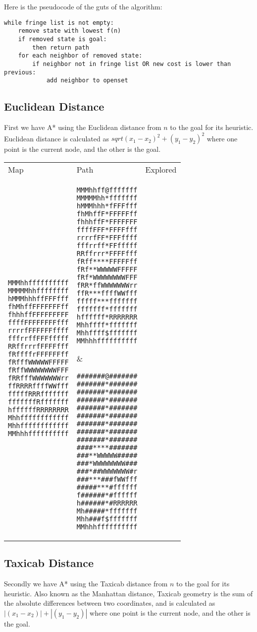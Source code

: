\documentclass[12pt, article]{scrartcl}
\begin{document}
Here is the pseudocode of the guts of the algorithm:
\begin{verbatim}
while fringe list is not empty:
    remove state with lowest f(n)
    if removed state is goal:
        then return path
    for each neighbor of removed state:
        if neighbor not in fringe list OR new cost is lower than previous:
            add neighbor to openset
\end{verbatim}

\subsection{Euclidean Distance}
First we have A* using the Euclidean distance from $n$ to the goal for its heuristic. Euclidean distance is calculated as $sqrt{(x_1-x_2)^2 + (y_1-y_2)^2}$ where one point is the current node, and the other is the goal.\\

\begin{tabular}{p{2in} p{2in} p{2in}}
Map & Path & Explored \\

\begin{verbatim}
MMMhhffffffffff
MMMMMhhffffffff
hMMMhhhffFFFfff
fhMhffFFFFFFFff
fhhhffFFFFFFFFF
ffffFFFFFFFFfff
rrrrfFFFFFFffff
fffrrffFFFfffff
RRffrrrfFFFFfff
fRffffrFFFFFFff
fRfffWWWWWFFFFF
fRffWWWWWWWWFFF
fRRfffWWWWWWWrr
ffRRRRffffWWfff
fffffRRRfffffff
fffffffRfffffff
hffffffRRRRRRRR
Mhhffffffffffff
Mhhffffffffffff
MMhhhffffffffff
\end{verbatim}
&
\begin{verbatim}
MMMhhff@fffffff
MMMMMhh*fffffff
hMMMhhh*fFFFfff
fhMhffF*FFFFFff
fhhhffF*FFFFFFF
ffffFFF*FFFFfff
rrrrfFF*FFFffff
fffrrff*FFfffff
RRffrrr*FFFFfff
fRff****FFFFFff
fRf**WWWWWFFFFF
fRf*WWWWWWWWFFF
fRR*ffWWWWWWWrr
ffR***ffffWWfff
fffff***fffffff
fffffff*fffffff
hffffff*RRRRRRR
Mhhffff*fffffff
Mhhffff$fffffff
MMhhhffffffffff
\end{verbatim}
&
\begin{verbatim}
#######@#######
#######*#######
#######*#######
#######*#######
#######*#######
#######*#######
#######*#######
#######*#######
#######*#######
####****#######
###**WWWWW#####
###*WWWWWWWW###
###*##WWWWWWW#r
###***###fWWfff
#####***#ffffff
f######*#ffffff
h######*#RRRRRR
Mh#####*fffffff
Mhh###f$fffffff
MMhhhffffffffff
\end{verbatim}
\end{tabular}

\subsection{Taxicab Distance}
Secondly we have A* using the Taxicab distance from $n$ to the goal for its heuristic. Also known as the Manhattan distance, Taxicab geometry is the sum of the absolute differences between two coordinates, and is calculated as $|(x_1-x_2)| + |(y_1-y_2)|$ where one point is the current node, and the other is the goal.\\
\end{document}
